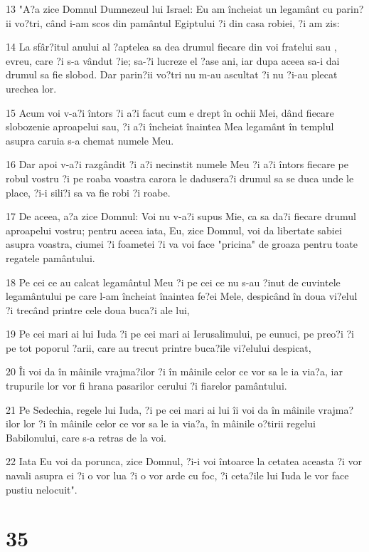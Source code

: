 \par 13 "A?a zice Domnul Dumnezeul lui Israel: Eu am încheiat un legamânt cu parin?ii vo?tri, când i-am scos din pamântul Egiptului ?i din casa robiei, ?i am zis:
\par 14 La sfâr?itul anului al ?aptelea sa dea drumul fiecare din voi fratelui sau , evreu, care ?i s-a vândut ?ie; sa-?i lucreze el ?ase ani, iar dupa aceea sa-i dai drumul sa fie slobod. Dar parin?ii vo?tri nu m-au ascultat ?i nu ?i-au plecat urechea lor.
\par 15 Acum voi v-a?i întors ?i a?i facut cum e drept în ochii Mei, dând fiecare slobozenie aproapelui sau, ?i a?i încheiat înaintea Mea legamânt în templul asupra caruia s-a chemat numele Meu.
\par 16 Dar apoi v-a?i razgândit ?i a?i necinstit numele Meu ?i a?i întors fiecare pe robul vostru ?i pe roaba voastra carora le dadusera?i drumul sa se duca unde le place, ?i-i sili?i sa va fie robi ?i roabe.
\par 17 De aceea, a?a zice Domnul: Voi nu v-a?i supus Mie, ca sa da?i fiecare drumul aproapelui vostru; pentru aceea iata, Eu, zice Domnul, voi da libertate sabiei asupra voastra, ciumei ?i foametei ?i va voi face "pricina" de groaza pentru toate regatele pamântului.
\par 18 Pe cei ce au calcat legamântul Meu ?i pe cei ce nu s-au ?inut de cuvintele legamântului pe care l-am încheiat înaintea fe?ei Mele, despicând în doua vi?elul ?i trecând printre cele doua buca?i ale lui,
\par 19 Pe cei mari ai lui Iuda ?i pe cei mari ai Ierusalimului, pe eunuci, pe preo?i ?i pe tot poporul ?arii, care au trecut printre buca?ile vi?elului despicat,
\par 20 Îi voi da în mâinile vrajma?ilor ?i în mâinile celor ce vor sa le ia via?a, iar trupurile lor vor fi hrana pasarilor cerului ?i fiarelor pamântului.
\par 21 Pe Sedechia, regele lui Iuda, ?i pe cei mari ai lui îi voi da în mâinile vrajma?ilor lor ?i în mâinile celor ce vor sa le ia via?a, în mâinile o?tirii regelui Babilonului, care s-a retras de la voi.
\par 22 Iata Eu voi da porunca, zice Domnul, ?i-i voi întoarce la cetatea aceasta ?i vor navali asupra ei ?i o vor lua ?i o vor arde cu foc, ?i ceta?ile lui Iuda le vor face pustiu nelocuit".

\chapter{35}

